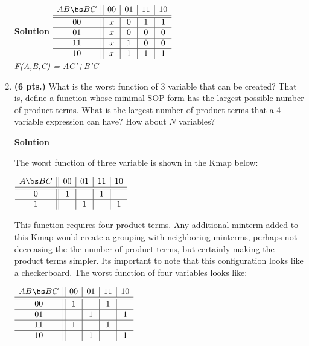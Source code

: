 \begin{enumerate}
\begin{onlysolution}  \textbf{Solution} \itshape{
$\begin{array} {c||c|c|c|c}
   A B \bs B C   & 00 & 01 & 11 & 10 \\ \hline \hline
       00        & x  & 0  & 1  & 1  \\ \hline
       01        & x  & 0  & 0  & 0  \\ \hline
       11        & x  & 1  & 0  & 0  \\ \hline
       10        & x  & 1  & 1  & 1  \\
\end{array}$  \\
F(A,B,C) = AC'+B'C
} \end{onlysolution} 

\item \textbf{ (6 pts.)} What is the worst function \SOPmin of 3 variable 
that can be created?  That is, define a function whose minimal SOP form 
has the largest possible number of product terms.  What is the largest 
number of product terms that a 4-variable \SOPmin expression can 
have?  How about $N$ variables?

\begin{onlysolution}  \textbf{Solution} \itshape{
The worst function of three variable is shown in the Kmap below:

$\begin{array} {c||c|c|c|c}
   A \bs B C   & 00 & 01 & 11 & 10 \\ \hline \hline
      0        & 1  &    & 1  &    \\ \hline
      1        &    & 1  &    & 1  \\ 
\end{array}$

This function requires four product terms.  Any additional minterm added to 
this Kmap would create a grouping with neighboring minterms, perhaps not 
decreasing the
the number of product terms, but certainly making the product terms simpler.
Its important to note that this configuration looks like a checkerboard.
The worst function of four variables looks like:

$\begin{array} {c||c|c|c|c}
   A B \bs B C   & 00 & 01 & 11 & 10 \\ \hline \hline
       00        & 1  &    & 1  &    \\ \hline
       01        &    & 1  &    & 1  \\ \hline
       11        & 1  &    & 1  &    \\ \hline
       10        &    & 1  &    & 1  \\
\end{array}$

}
\end{onlysolution}
\end{enumerate}
